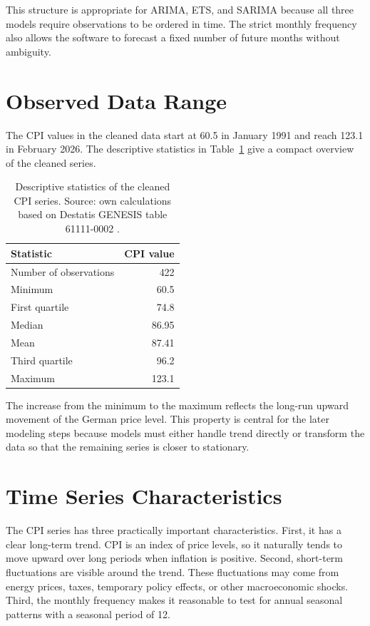 This structure is appropriate for ARIMA, ETS, and SARIMA because all three models require observations to be ordered in time. The strict monthly frequency also allows the software to forecast a fixed number of future months without ambiguity.

\section{Observed Data Range}

The CPI values in the cleaned data start at 60.5 in January 1991 and reach 123.1 in February 2026. The descriptive statistics in Table~\ref{tab:cpi-descriptive-statistics} give a compact overview of the cleaned series.

\begin{table}[htbp]
	\centering
	\caption{Descriptive statistics of the cleaned CPI series. Source: own calculations based on Destatis GENESIS table 61111-0002 \cite{DestatisCPIQuality2023,DestatisCPIWeighting2023}.}
	\label{tab:cpi-descriptive-statistics}
	\begin{tabular}{lr}
		\hline
		Statistic & CPI value \\
		\hline
		Number of observations & 422 \\
		Minimum & 60.5 \\
		First quartile & 74.8 \\
		Median & 86.95 \\
		Mean & 87.41 \\
		Third quartile & 96.2 \\
		Maximum & 123.1 \\
		\hline
	\end{tabular}
\end{table}

The increase from the minimum to the maximum reflects the long-run upward movement of the German price level. This property is central for the later modeling steps because models must either handle trend directly or transform the data so that the remaining series is closer to stationary.

\section{Time Series Characteristics}

The CPI series has three practically important characteristics. First, it has a clear long-term trend. CPI is an index of price levels, so it naturally tends to move upward over long periods when inflation is positive. Second, short-term fluctuations are visible around the trend. These fluctuations may come from energy prices, taxes, temporary policy effects, or other macroeconomic shocks. Third, the monthly frequency makes it reasonable to test for annual seasonal patterns with a seasonal period of 12.

